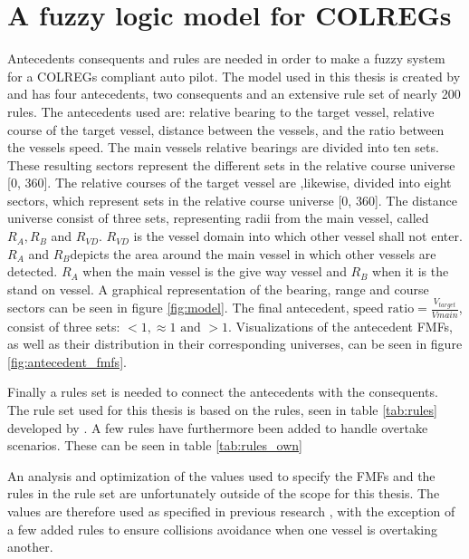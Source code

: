 \section{A fuzzy logic model for COLREGs}
\label{section:model}
Antecedents consequents and rules are needed in order to make a fuzzy system for a COLREGs compliant auto pilot. The model used in this thesis is created by \textcite{perera2012intelligent} and has four antecedents, two consequents and an extensive rule set of nearly 200 rules. The antecedents used are: relative bearing to the target vessel, relative course of the target vessel, distance between the vessels, and the ratio between the vessels speed. The main vessels relative bearings are divided into ten sets. These resulting sectors represent the different sets in the relative course universe [0, 360]. The relative courses of the target vessel are ,likewise, divided into eight sectors, which represent sets in the relative course universe [0, 360]. The distance universe consist of three sets, representing radii from the main vessel, called $R_A, R_B$ and $R_{VD}$. $R_{VD}$ is the vessel domain into which other vessel shall not enter. $R_A$ and $R_B $depicts the area around the main vessel in which other vessels are detected. $R_A$ when the main vessel is the give way vessel and $R_B$ when it is the stand on vessel. A graphical representation of the bearing, range and course sectors can be seen in figure \ref{fig:model}. The final antecedent, $\text{speed ratio} =\frac{V_{target}}{V{main}}$, consist of three sets: $<1, \approx1 \text{ and } >1$.
Visualizations of the antecedent FMFs, as well as their distribution in their corresponding universes, can be seen in figure \ref{fig:antecedent_fmfs}.

Finally a rules set is needed to connect the antecedents with the consequents. The rule set used for this thesis is based on  the rules, seen in table \ref{tab:rules} developed by \textcite{perera2012intelligent}. A few rules have furthermore been added to handle overtake scenarios. These can be seen in table \ref{tab:rules_own}

An analysis and optimization of the values used to specify the FMFs and the rules in the rule set are unfortunately outside of the scope for this thesis. The values are therefore used as specified in previous research \cite{perera2012intelligent}, with the exception of a few added rules to ensure collisions avoidance when one vessel is overtaking another.


